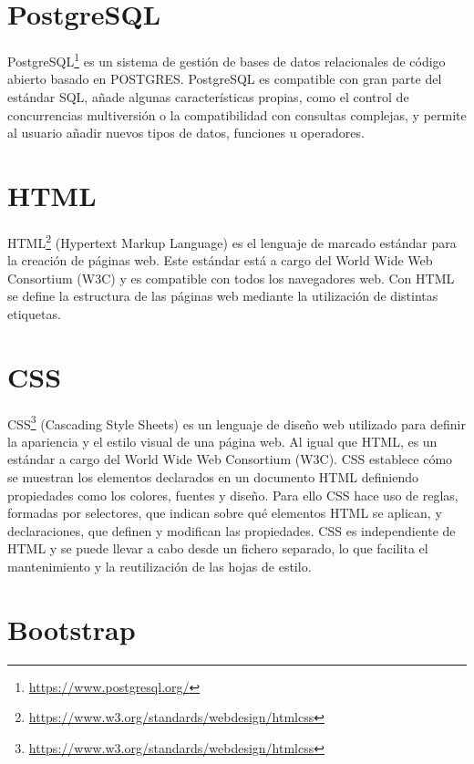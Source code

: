 \documentclass[a4paper, 12pt]{book}
\begin{document}
\section{PostgreSQL} 
\label{sec:postgresql}

PostgreSQL\footnote{\url{https://www.postgresql.org/}} es un sistema de gestión de bases de datos relacionales de código abierto basado en POSTGRES. PostgreSQL es compatible con gran parte del estándar SQL, añade algunas características propias, como el control de concurrencias multiversión o la compatibilidad con consultas complejas, y permite al usuario añadir nuevos tipos de datos, funciones u operadores.

\section{HTML} 
\label{sec:html}

HTML\footnote{\url{https://www.w3.org/standards/webdesign/htmlcss}} (Hypertext Markup Language) es el lenguaje de marcado estándar para la creación de páginas web. Este estándar está a cargo del World Wide Web Consortium (W3C) y es compatible con todos los navegadores web.
Con HTML se define la estructura de las páginas web mediante la utilización de distintas etiquetas.

\section{CSS} 
\label{sec:css}

CSS\footnote{\url{https://www.w3.org/standards/webdesign/htmlcss}} (Cascading Style Sheets) es un lenguaje de diseño web utilizado para definir la apariencia y el estilo visual de una página web. Al igual que HTML, es un estándar a cargo del World Wide Web Consortium (W3C).
CSS establece cómo se muestran los elementos declarados en un documento HTML definiendo propiedades como los colores, fuentes y diseño. Para ello CSS hace uso de reglas, formadas por selectores, que indican sobre qué elementos HTML se aplican, y declaraciones, que definen y modifican las propiedades.
CSS es independiente de HTML y se puede llevar a cabo desde un fichero separado, lo que facilita el mantenimiento y la reutilización de las hojas de estilo.


\section{Bootstrap} 
\label{sec:bootstrap}
\end{document}
